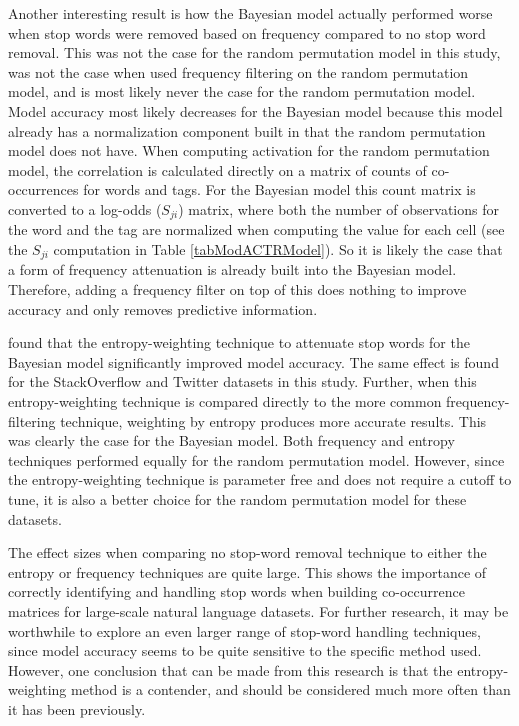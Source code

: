 \documentclass[man,floatsintext,donotrepeattitle]{apa6}
\begin{document}
Another interesting result is how the Bayesian model actually performed worse when stop words were removed based on frequency compared to no stop word removal.
This was not the case for the random permutation model in this study, was not the case when \textcite{Sahlgren2008} used frequency filtering on the random permutation model,
and is most likely never the case for the random permutation model.
Model accuracy most likely decreases for the Bayesian model because this model already has a normalization component built in that the random permutation model does not have.
When computing activation for the random permutation model, the correlation is calculated directly on a matrix of counts of co-occurrences for words and tags.
For the Bayesian model this count matrix is converted to a log-odds ($S_{ji}$) matrix,
where both the number of observations for the word and the tag are normalized when computing the value for each cell (see the $S_{ji}$ computation in Table \ref{tabModACTRModel}).
So it is likely the case that a form of frequency attenuation is already built into the Bayesian model.
Therefore, adding a frequency filter on top of this does nothing to improve accuracy and only removes predictive information.

\textcite{Stanley2013} found that the entropy-weighting technique to attenuate stop words for the Bayesian model significantly improved model accuracy.
The same effect is found for the StackOverflow and Twitter datasets in this study.
Further, when this entropy-weighting technique is compared directly to the more common frequency-filtering technique, weighting by entropy produces more accurate results.
This was clearly the case for the Bayesian model.
Both frequency and entropy techniques performed equally for the random permutation model.
However, since the entropy-weighting technique is parameter free and does not require a cutoff to tune, it is also a better choice for the random permutation model for these datasets.

The effect sizes when comparing no stop-word removal technique to either the entropy or frequency techniques are quite large.
This shows the importance of correctly identifying and handling stop words when building co-occurrence matrices for large-scale natural language datasets.
For further research, it may be worthwhile to explore an even larger range of stop-word handling techniques,
since model accuracy seems to be quite sensitive to the specific method used. 
However, one conclusion that can be made from this research is that the entropy-weighting method is a contender, and should be considered much more often than it has been previously.
\end{document}
